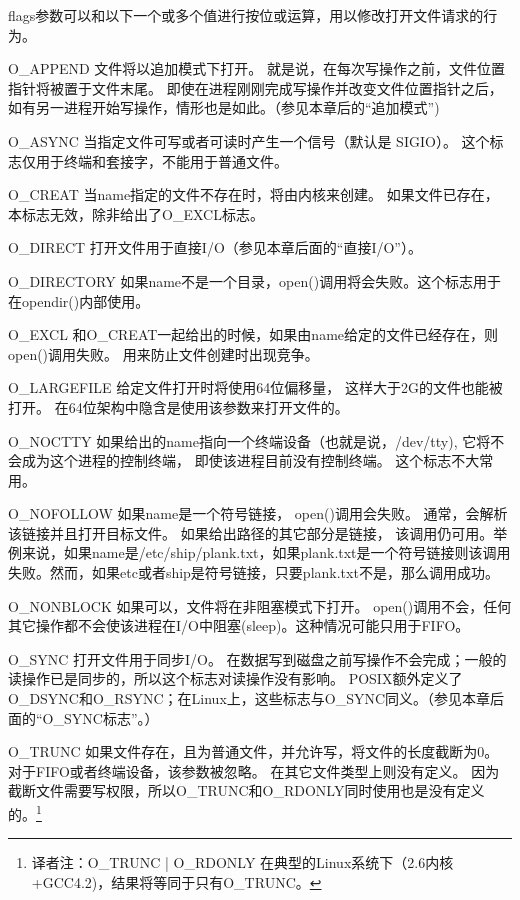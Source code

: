 flags参数可以和以下一个或多个值进行按位或运算，用以修改打开文件请求的行为。
\begin{eqlist*}
\item [O\_APPEND]
文件将以追加模式下打开。 就是说，在每次写操作之前，文件位置指针将被置于文件末尾。 即使在进程刚刚完成写操作并改变文件位置指针之后，如有另一进程开始写操作，情形也是如此。（参见本章后的“追加模式”) 
\item [O\_ASYNC]
当指定文件可写或者可读时产生一个信号（默认是 SIGIO）。 这个标志仅用于终端和套接字，不能用于普通文件。 
\item [O\_CREAT]
当name指定的文件不存在时，将由内核来创建。 如果文件已存在，本标志无效，除非给出了O\_EXCL标志。 
\item [O\_DIRECT]
打开文件用于直接I/O（参见本章后面的“直接I/O”）。 
\item [O\_DIRECTORY]
如果name不是一个目录，open()调用将会失败。这个标志用于在opendir()内部使用。 
\item [O\_EXCL]
和O\_CREAT一起给出的时候，如果由name给定的文件已经存在，则open()调用失败。 用来防止文件创建时出现竞争。 
\item [O\_LARGEFILE]
给定文件打开时将使用64位偏移量， 这样大于2G的文件也能被打开。 在64位架构中隐含是使用该参数来打开文件的。 
\item [O\_NOCTTY]
如果给出的name指向一个终端设备（也就是说，/dev/tty), 它将不会成为这个进程的控制终端， 即使该进程目前没有控制终端。 这个标志不大常用。 
\item [O\_NOFOLLOW]
如果name是一个符号链接， open()调用会失败。 通常，会解析该链接并且打开目标文件。 如果给出路径的其它部分是链接， 该调用仍可用。举例来说，如果name是/etc/ship/plank.txt，如果plank.txt是一个符号链接则该调用失败。然而，如果etc或者ship是符号链接，只要plank.txt不是，那么调用成功。 
\item [O\_NONBLOCK]
如果可以，文件将在非阻塞模式下打开。 open()调用不会，任何其它操作都不会使该进程在I/O中阻塞(sleep)。这种情况可能只用于FIFO。 
\item [O\_SYNC]
打开文件用于同步I/O。 在数据写到磁盘之前写操作不会完成；一般的读操作已是同步的，所以这个标志对读操作没有影响。 POSIX额外定义了O\_DSYNC和O\_RSYNC；在Linux上，这些标志与O\_SYNC同义。（参见本章后面的“O\_SYNC标志”。） 
\item [O\_TRUNC]
如果文件存在，且为普通文件，并允许写，将文件的长度截断为0。 对于FIFO或者终端设备，该参数被忽略。 在其它文件类型上则没有定义。 因为截断文件需要写权限，所以O\_TRUNC和O\_RDONLY同时使用也是没有定义的。\footnote[1]{译者注：O\_TRUNC | O\_RDONLY 在典型的Linux系统下（2.6内核+GCC4.2)，结果将等同于只有O\_TRUNC。}
\end{eqlist*}

